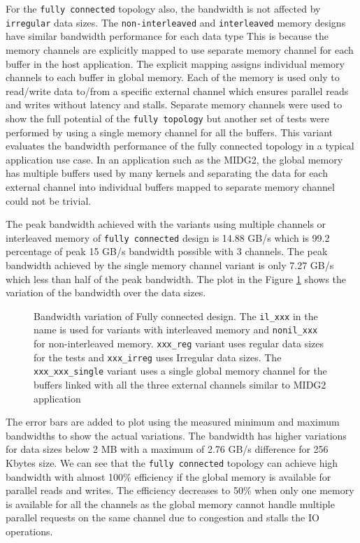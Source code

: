 For the \texttt{fully connected} topology also, the bandwidth is not affected by \texttt{irregular} data sizes.
The \texttt{non-interleaved} and \texttt{interleaved} memory designs have similar bandwidth performance for each data type
This is because the memory channels are explicitly mapped to use separate memory channel for each buffer in the host application.
The explicit mapping assigns individual memory channels to each buffer in global memory. Each of the memory
is used only to read/write data to/from a specific external channel which ensures parallel reads
and writes without latency and stalls. Separate memory channels were used to show the full potential
of the \texttt{fully topology} but another set of tests were performed by using a single memory
channel for all the buffers. This variant evaluates the bandwidth performance of the fully connected
topology in a typical application use case. In an application such as the MIDG2, the global memory
has multiple buffers used by many kernels and separating the data for each external channel into individual
buffers mapped to separate memory channel could not be trivial.

The peak bandwidth achieved with the variants using multiple channels or interleaved memory of \texttt{fully connected}
design is 14.88 GB/s which is 99.2 percentage of peak 15 GB/s bandwidth possible with 3 channels.
The peak bandwidth achieved by the single memory channel variant is only 7.27 GB/s which less than
half of the peak bandwidth. The plot in the Figure \ref{plot:fc} shows the variation of the bandwidth over the data sizes.
\begin{figure}[ht]
    \centering
    \scalebox{0.7}{}
    \caption{Bandwidth variation of Fully connected design.
    The \texttt{il\_xxx} in the name is used for variants with interleaved memory and \texttt{nonil\_xxx} for non-interleaved memory.
    \texttt{xxx\_reg} variant uses regular data sizes for the tests and \texttt{xxx\_irreg} uses Irregular data sizes.
    The \texttt{xxx\_xxx\_single} variant uses a single global memory channel for the buffers linked with all the
    three external channels similar to MIDG2 application }
    \label{plot:fc}
\end{figure}
The error bars are added to plot using the measured minimum and maximum bandwidths to show the actual
variations. The bandwidth has higher variations for data sizes below 2 MB with a maximum of 2.76 GB/s
difference for 256 Kbytes size. We can see that the \texttt{fully connected} topology can achieve
high bandwidth with almost 100\% efficiency if the global memory is available for parallel
reads and writes. The efficiency decreases to 50\% when only one memory is available for all the channels
as the global memory cannot handle multiple parallel requests on the same channel due to congestion
and stalls the IO operations.

